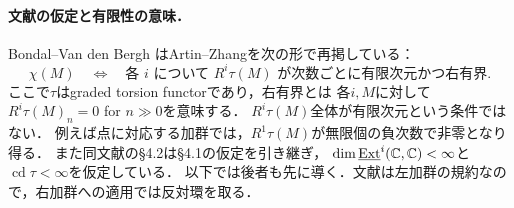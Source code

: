 \documentclass[11pt,a4paper]{ltjsarticle}
\begin{document}
\paragraph{文献の仮定と有限性の意味．}
Bondal--Van den Bergh\cite[\S4.2, Lemma 4.2.1]{BvdBGenerators}
はArtin--Zhang\cite[Corollary 3.6(3)]{AZ}を次の形で再掲している：
\[
 \chi(M)\quad\Longleftrightarrow\quad
 \text{各 }i\text{ について }R^i\tau(M)\text{ が次数ごとに有限次元かつ右有界}.
\]
ここで$\tau$はgraded torsion functorであり，右有界とは
各$i,M$に対して$R^i\tau(M)_n=0$ for $n\gg0$を意味する．
$R^i\tau(M)$全体が有限次元という条件ではない．
例えば点に対応する加群では，$R^1\tau(M)$が無限個の負次数で非零となり得る．
また同文献の\S4.2は\S4.1の仮定を引き継ぎ，
$\dim\underline{\operatorname{Ext}}^i(\mathbb C,\mathbb C)<\infty$と$\operatorname{cd}\tau<\infty$を仮定している．
以下では後者も先に導く．文献は左加群の規約なので，右加群への適用では反対環を取る．
\end{document}
